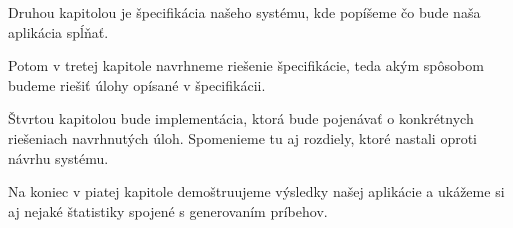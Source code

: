 Druhou kapitolou je špecifikácia našeho systému, kde popíšeme čo bude naša aplikácia spĺňať.\par
Potom v tretej kapitole navrhneme riešenie špecifikácie, teda akým spôsobom budeme riešiť úlohy opísané v špecifikácii.\par
Štvrtou kapitolou bude implementácia, ktorá bude pojenávať o konkrétnych riešeniach navrhnutých úloh. Spomenieme tu aj rozdiely, ktoré nastali oproti návrhu systému.\par
Na koniec v piatej kapitole demoštruujeme výsledky našej aplikácie a ukážeme si aj nejaké štatistiky spojené s generovaním príbehov.


